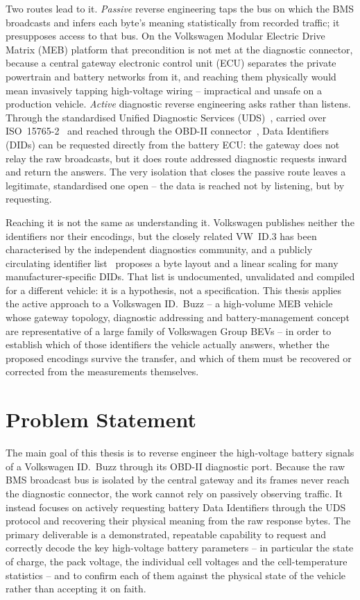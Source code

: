 \documentclass[11pt,a4paper,oneside,parskip=half]{scrreprt}
\begin{document}
Two routes lead to it. \textit{Passive} reverse engineering taps the bus on which the BMS broadcasts and infers each byte's meaning statistically from recorded traffic; it presupposes access to that bus. On the Volkswagen Modular Electric Drive Matrix (MEB) platform that precondition is not met at the diagnostic connector, because a central gateway electronic control unit (ECU) separates the private powertrain and battery networks from it, and reaching them physically would mean invasively tapping high-voltage wiring -- impractical and unsafe on a production vehicle. \textit{Active} diagnostic reverse engineering asks rather than listens. Through the standardised Unified Diagnostic Services (UDS)~\cite{iso14229}, carried over ISO~15765-2~\cite{iso15765} and reached through the OBD-II connector~\cite{saej1962}, Data Identifiers (DIDs) can be requested directly from the battery ECU: the gateway does not relay the raw broadcasts, but it does route addressed diagnostic requests inward and return the answers. The very isolation that closes the passive route leaves a legitimate, standardised one open -- the data is reached not by listening, but by requesting.

Reaching it is not the same as understanding it. Volkswagen publishes neither the identifiers nor their encodings, but the closely related VW~ID.3 has been characterised by the independent diagnostics community, and a publicly circulating identifier list~\cite{vwmebpidlist} proposes a byte layout and a linear scaling for many manufacturer-specific DIDs. That list is undocumented, unvalidated and compiled for a different vehicle: it is a hypothesis, not a specification. This thesis applies the active approach to a Volkswagen ID.~Buzz -- a high-volume MEB vehicle whose gateway topology, diagnostic addressing and battery-management concept are representative of a large family of Volkswagen Group BEVs -- in order to establish which of those identifiers the vehicle actually answers, whether the proposed encodings survive the transfer, and which of them must be recovered or corrected from the measurements themselves.

\section{Problem Statement}
\label{sec:problem}
The main goal of this thesis is to reverse engineer the high-voltage battery signals of a Volkswagen ID.~Buzz through its OBD-II diagnostic port. Because the raw BMS broadcast bus is isolated by the central gateway and its frames never reach the diagnostic connector, the work cannot rely on passively observing traffic. It instead focuses on actively requesting battery Data Identifiers through the UDS protocol and recovering their physical meaning from the raw response bytes. The primary deliverable is a demonstrated, repeatable capability to request and correctly decode the key high-voltage battery parameters -- in particular the state of charge, the pack voltage, the individual cell voltages and the cell-temperature statistics -- and to confirm each of them against the physical state of the vehicle rather than accepting it on faith.
\end{document}
